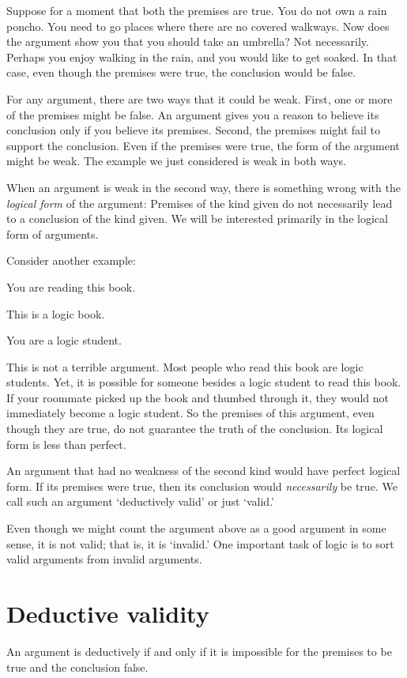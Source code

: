 Suppose for a moment that both the premises are true. You do not own a rain poncho. You need to go places where there are no covered walkways. Now does the argument show you that you should take an umbrella? Not necessarily. Perhaps you enjoy walking in the rain, and you would like to get soaked. In that case, even though the premises were true, the conclusion would be false.

For any argument, there are two ways that it could be weak. First, one or more of the premises might be false. An argument gives you a reason to believe its conclusion only if you believe its premises. Second, the premises might fail to support the conclusion. Even if the premises were true, the form of the argument might be weak. The example we just considered is weak in both ways.

When an argument is weak in the second way, there is something wrong with the \emph{logical form} of the argument: Premises of the kind given do not necessarily lead to a conclusion of the kind given. We will be interested primarily in the logical form of arguments.

Consider another example:
\begin{earg}
\item[] You are reading this book.
\item[] This is a logic book.
\item[\therefore] You are a logic student.
\end{earg}
This is not a terrible argument. Most people who read this book are logic students. Yet, it is possible for someone besides a logic student to read this book. If your roommate picked up the book and thumbed through it, they would not immediately become a logic student. So the premises of this argument, even though they are true, do not guarantee the truth of the conclusion. Its logical form is less than perfect.

An argument that had no weakness of the second kind would have perfect logical form. If its premises were true, then its conclusion would \emph{necessarily} be true. We call such an argument `deductively valid' or just `valid.'

Even though we might count the argument above as a good argument in some sense, it is not valid; that is, it is `invalid.' One important task of logic is to sort valid arguments from invalid arguments.



\section{Deductive validity}
An argument is deductively  if and only if it is impossible for the premises to be true and the conclusion false.

